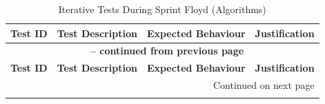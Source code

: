 \begin{longtable}{|p{}|p{}|p{}|p{}|}
	\caption{Iterative Tests During Sprint Floyd (Algorithms)} \label{tab:sprint_floyd_tests_lt_rev} \\
	\hline
	\textbf{Test ID} & \textbf{Test Description} & \textbf{Expected Behaviour} & \textbf{Justification} \\
	\hline
	\endfirsthead
	\multicolumn{4}{c}{{\bfseries \tablename\ \thetable{} -- continued from previous page}} \\ \hline
	\textbf{Test ID} & \textbf{Test Description} & \textbf{Expected Behaviour} & \textbf{Justification} \\ \hline \endhead
	\hline \multicolumn{4}{r}{{Continued on next page}} \\ \endfoot \hline \endlastfoot
	

\end{longtable}
